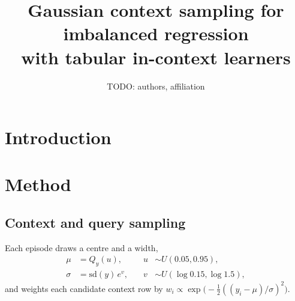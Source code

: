 \documentclass[10pt,twocolumn]{article}
\title{\vspace{-1.2em}Gaussian context sampling for imbalanced regression\\
       with tabular in-context learners}
\author{TODO: authors, affiliation}
\date{}
\begin{document}
\maketitle

\begin{abstract}
\end{abstract}

\section{Introduction}

\section{Method}
\subsection{Context and query sampling}
Each episode draws a centre and a width,
\begin{equation}
\begin{aligned}
\mu &= Q_y(u), &\quad u &\sim U(0.05, 0.95),\\
\sigma &= \mathrm{sd}(y)\, e^{v}, &\quad v &\sim U(\log 0.15, \log 1.5),
\end{aligned}
\end{equation}
and weights each candidate context row by
$w_i \propto \exp\!\big(-\tfrac12((y_i-\mu)/\sigma)^2\big)$.
\end{document}
